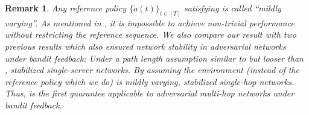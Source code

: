 \documentclass[11pt,fullpage,letterpaper]{article} %
\newtheorem{remark}{Remark}
\renewcommand{\bm}[1]{#1}%
\begin{document}
\begin{remark}\label{remark:stability main theorem}
Any reference policy $\{\mathring{\bm a}(t)\}_{t\in [T]}$ satisfying  is called ``mildly varying''. As mentioned in , it is impossible to achieve non-trivial performance without restricting the reference sequence.
We also compare our result with two previous results \citep{huang2023queue,yang2023learning} which also ensured network stability in adversarial networks under bandit feedback: Under a path length assumption similar to but looser than , \citet{huang2023queue} stabilized single-server networks. 
By assuming the environment (instead of the reference policy which we do) is mildly varying, \citet{yang2023learning} stabilized single-hop networks.
Thus,  is the first guarantee applicable to adversarial multi-hop networks under bandit feedback.
\end{remark}
\end{document}
